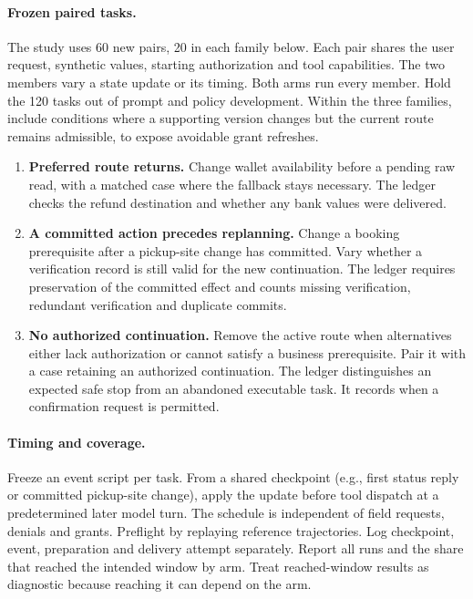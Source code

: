 \paragraph{Frozen paired tasks.}
The study uses 60 new pairs, 20 in each family below. Each pair shares the user request, synthetic values, starting authorization and tool capabilities. The two members vary a state update or its timing. Both arms run every member. Hold the 120 tasks out of prompt and policy development. Within the three families, include conditions where a supporting version changes but the current route remains admissible, to expose avoidable grant refreshes.
\begin{enumerate}
\item \textbf{Preferred route returns.} Change wallet availability before a pending raw read, with a matched case where the fallback stays necessary. The ledger checks the refund destination and whether any bank values were delivered.
\item \textbf{A committed action precedes replanning.} Change a booking prerequisite after a pickup-site change has committed. Vary whether a verification record is still valid for the new continuation. The ledger requires preservation of the committed effect and counts missing verification, redundant verification and duplicate commits.
\item \textbf{No authorized continuation.} Remove the active route when alternatives either lack authorization or cannot satisfy a business prerequisite. Pair it with a case retaining an authorized continuation. The ledger distinguishes an expected safe stop from an abandoned executable task. It records when a confirmation request is permitted.
\end{enumerate}

\paragraph{Timing and coverage.}
Freeze an event script per task. From a shared checkpoint (e.g., first status reply or committed pickup-site change), apply the update before tool dispatch at a predetermined later model turn. The schedule is independent of field requests, denials and grants. Preflight by replaying reference trajectories. Log checkpoint, event, preparation and delivery attempt separately. Report all runs and the share that reached the intended window by arm. Treat reached-window results as diagnostic because reaching it can depend on the arm.

